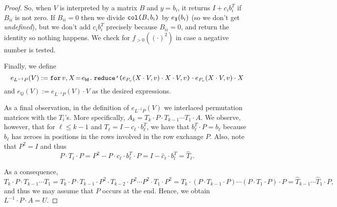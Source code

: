 \begin{proof}
    
    So, when $V$ is interpreted by a matrix $B$ and $y=b_i$, it returns $I+c_ib_i^T$ if $B_{ii}$ is not zero. 
    If $B_{ii}=0$ then we divide $\ccol{B}{b_i}$ by $e_{\ones}(b_i)$ (so we don't get \textit{undefined}), 
    but we don't add $c_ib_i^T$ precisely because $B_{ii}=0$, and return the identity so nothing happens. We check 
    for $f_{>0}((\cdot)^2)$ in case a negative number is tested.

    Finally, we define
    $$
    e_{L^{-1}P}(V):=\initf{e_{\mathsf{Id}}}{v}{X}{\redd{e_{P_v}(X\cdot V,v)\cdot X\cdot V}{v}\cdot e_{P_v}(X\cdot V,v)\cdot X}
    $$
    and $e_{\mathsf{U}}(V):=e_{L^{-1}P}(V)\cdot V$ as the desired expressions.

    As a final observation, in the definition of $e_{L^{-1}P}(V)$ 
    we interlaced permutation matrices with the $T_i$'s. More specifically, 
    $A_k=T_k\cdot P\cdot T_{k-1}\cdots T_1\cdot A$. We observe, however, that for $\ell\leq k-1$ and
    $T_{\ell}=I-c_\ell\cdot b_\ell^T$, we have that  $b_\ell^T\cdot P=b_\ell$ because $b_\ell$ has zeroes in positions in the rows involved in the row exchange $P$. Also, note that  $P^2=I$ and thus 
    $$P\cdot T_\ell\cdot P=P^2-P\cdot c_\ell\cdot b_\ell^T\cdot P=I-\widehat{c}_\ell\cdot b_l^T=\widehat{T}_\ell.$$

    As a consequence,
    $$
    T_k\cdot P\cdot T_{k-1}\cdots T_1=T_k\cdot P\cdot T_{k-1}\cdot P^2\cdot T_{k-2}\cdot P^2\cdots P^2 \cdot T_1\cdot P^2=T_k\cdot (P\cdot T_{k-1}\cdot P)\cdots (P\cdot T_1\cdot P)\cdot P=\widehat{T}_{k-1}\cdots \widehat{T}_1\cdot P,
    $$
    and thus we may assume that $P$ occurs at the end. Hence, we obtain $L^{-1}\cdot P\cdot A=U$.

\end{proof}
